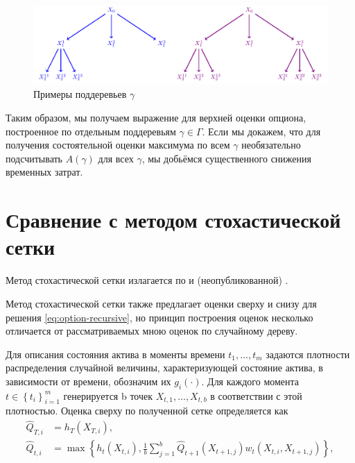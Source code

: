 \documentclass[specialist,
               substylefile = ../spbu.rtx,
               subf,href,colorlinks=true, 12pt]{disser}
\begin{document}
\begin{figure}[!t]
    \includegraphics[width=\textwidth]{exponential_subtrees}
    \caption{Примеры поддеревьев $\gamma$}
    \label{fig:subtrees}
\end{figure}

Таким образом, мы получаем выражение для верхней оценки опциона, построенное по отдельным поддеревьям $\gamma\in\Gamma$. Если мы докажем, что для получения состоятельной оценки максимума по всем $\gamma$ необязательно подсчитывать $A\left(\gamma\right)$ для всех $\gamma$, мы добьёмся существенного снижения временных затрат.

\chapter{Сравнение с методом стохастической сетки}

Метод стохастической сетки излагается по \cite{Broadie2004} и (неопубликованной) \cite{Kashtanov2015}.

Метод стохастической сетки также предлагает оценки сверху и снизу для решения \eqref{eq:option-recursive}, но принцип построения оценок несколько отличается от рассматриваемых мною оценок по случайному дереву.

Для описания состояния актива в моменты времени $t_1, \ldots, t_m$ задаются плотности распределения случайной величины, характеризующей состояние актива, в зависимости от времени, обозначим их $g_i\left(\cdot\right)$. Для каждого момента $t\in\left\lbrace t_i \right\rbrace_{i=1}^m$ генерируется b точек $X_{t,1}, \ldots, X_{t, b}$ в соответствии с этой плотностью. Оценка сверху по полученной сетке определяется как
\begin{equation}\begin{aligned}
\hat Q_{T, i} &= h_T\left(X_{T, i}\right), \\
\hat Q_{t, i} &= \max\left\lbrace h_t\left(X_{t, i}\right), \frac{1}{b}\sum_{j=1}^b \hat Q_{t+1}\left(X_{t+1, j}\right) w_t\left(X_{t, i}, X_{t+1, j}\right)\right\rbrace,
\end{aligned}\end{equation}
\end{document}
